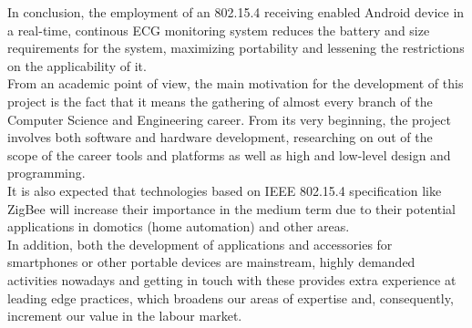 		In conclusion, the employment of an 802.15.4 receiving enabled Android device in a real-time, continous ECG monitoring system reduces the battery and size requirements for the system, maximizing portability and lessening the restrictions on the applicability of it.\\

		From an academic point of view, the main motivation for the development of this project is the fact that it means
		the gathering of almost every branch of the Computer Science and Engineering career. From its very beginning, the
		project involves both software and hardware development, researching on out of the scope of the career 
		tools and platforms as well as high and low-level design and programming.\\

		It is also
		expected that technologies based on IEEE 802.15.4 specification like ZigBee will increase their
		importance in the medium term due to their potential applications in domotics (home automation) and other areas.\\

		In addition, both the development of applications and accessories for smartphones or other portable devices
		are mainstream, highly demanded activities nowadays and getting in touch with these
		provides extra experience at leading edge practices, which broadens our areas of
		expertise and, consequently, increment our value in the labour market.\\

		
